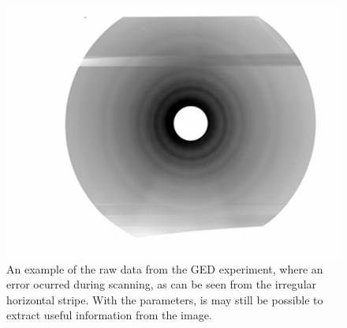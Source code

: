 \begin{figure}
\includegraphics[width=12cm]{example}
\caption{An example of the raw data from the GED experiment, where an error ocurred during scanning, as can be seen from the irregular horizontal stripe. With the parameters, is may still be possible to extract useful information from the image.}
\label{example} 
\end{figure} 


 